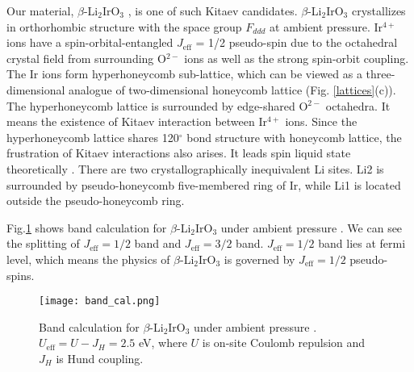 Our material, $\beta$-Li$_2$IrO$_3$ \cite{takayama2015hyperhoneycomb}, is one of such Kitaev candidates.
$\beta$-Li$_2$IrO$_3$ crystallizes in orthorhombic structure with the space group $F_{ddd}$ at ambient pressure.
Ir$^{4+}$ ions have a spin-orbital-entangled $J_\mathrm{eff}$ = 1/2 pseudo-spin due to the octahedral crystal field from surrounding O$^{2-}$ ions
as well as the strong spin-orbit coupling.
The Ir ions form hyperhoneycomb sub-lattice, which can be viewed as a three-dimensional analogue of two-dimensional honeycomb lattice (Fig. \ref{lattices}(c)).
The hyperhoneycomb lattice is surrounded by edge-shared O$^{2-}$ octahedra.
It means the existence of Kitaev interaction between Ir$^{4+}$ ions.
Since the hyperhoneycomb lattice shares 120$^\circ$ bond structure with honeycomb lattice, the frustration of Kitaev interactions also arises.
It leads spin liquid state theoretically \cite{mandal2009exactly}.
There are two crystallographically inequivalent Li sites.
Li2 is surrounded by pseudo-honeycomb five-membered ring of Ir, while Li1 is located outside the pseudo-honeycomb ring.

Fig.\ref{band_cal} shows band calculation for $\beta$-Li$_2$IrO$_3$ under ambient pressure \cite{veiga2017pressure}.
We can see the splitting of $J_\mathrm{eff} = 1/2$ band and $J_\mathrm{eff} = 3/2$ band.
$J_\mathrm{eff} = 1/2$ band lies at fermi level, which means the physics of $\beta$-Li$_2$IrO$_3$ is governed by $J_\mathrm{eff} = 1/2$ pseudo-spins.

\begin{figure}
  \centering
  \texttt{[image: band\_cal.png]}
  \caption{Band calculation for $\beta$-Li$_2$IrO$_3$ under ambient pressure \cite{veiga2017pressure}. $U_\mathrm{eff} = U - J_H = 2.5$ eV, where $U$ is on-site Coulomb repulsion
  and $J_H$ is Hund coupling.}
  \label{band_cal}
\end{figure}

